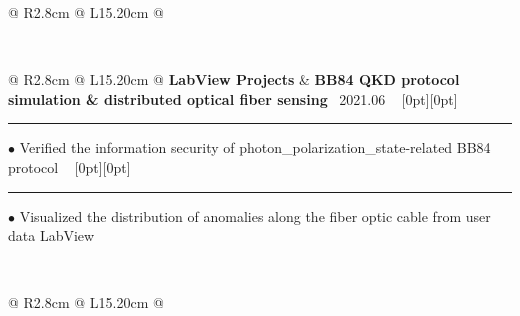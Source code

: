 {{\begin{tabularx}{\linewidth}{@{} R{2.8cm} @{\phantom{d}} L{15.20cm} @{}}
\href{https://github.com/ChenZhu-Xie/NLAST}{\raisebox{-0.05\height}{\color{black!50}\faGithub}} \\ \Gap\Gap\Gap
\end{tabularx}
\\
\begin{tabularx}{\linewidth}{@{} R{2.8cm} @{\phantom{d}} L{15.20cm} @{}}
	\textbf{LabView Projects} & \hspace{10pt} \textbf{BB84 QKD protocol simulation \& distributed optical fiber sensing} \hfill \textendash\ 2021.06 \newline \vspace{2pt} \ \hspace{-3pt} \raisebox{0.09\height}[0pt][0pt]{\vrule width0.5pt height30.0pt} \hspace{-0.30em}\rule[0.25em]{1.0em}{0.5pt}\!\! $\bullet$ {\small Verified the information security of photon\_polarization\_state-related BB84 protocol} \hfill \href{https://github.com/ChenZhu-Xie/postgraduate_courses/tree/master/3__2.2__Engineering_Course/2__2.2__Information_Technology_\%E2\%86\%90_RoamEdit\%2BLabView__1.0_year/\%E6\%88\%91\%E7\%9A\%84\%E8\%AF\%BE\%E8\%AE\%BE}{\color{black!50}\faGithub} \newline \vspace{-3pt} \ \hspace{-3pt} \raisebox{0.18\height}[0pt][0pt]{\vrule width0.5pt height14.5pt} \hspace{-0.30em}\rule[0.25em]{1.0em}{0.5pt}\!\! $\bullet$ {\small Visualized the distribution of anomalies along the fiber optic cable from user data} \hfill {\small \color{color-detail} LabView} \href{https://github.com/ChenZhu-Xie/postgraduate_courses/tree/master/3__2.2__Engineering_Course/3__2.3__Labview__1.0_year/\%E8\%99\%9A\%E6\%8B\%9F\%E4\%BB\%AA\%E5\%99\%A82021\%E8\%AF\%BE\%E8\%AE\%BE_\%E9\%80\%89\%E9\%A2\%98\%E4\%B8\%80_\%E8\%B0\%A2\%E5\%B0\%98\%E7\%AB\%B9}{\color{black!50}\faGithub} \\ \Gap\Gap\Gap
\end{tabularx}
\\
\begin{tabularx}{\linewidth}{@{} R{2.8cm} @{\phantom{d}} L{15.20cm} @{}}

\end{tabularx}}}
